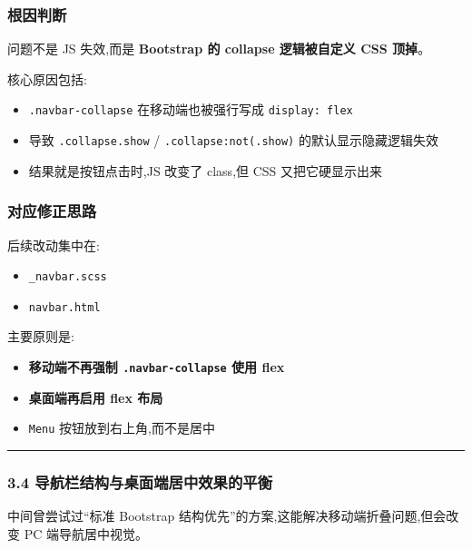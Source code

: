 \documentclass[lang=cn,scheme=chinese,color=blue,device=normal,toc=onecol,math=cm]{elegantbook}
\begin{document}
\subsubsection{根因判断}


问题不是 JS 失效,而是 \textbf{Bootstrap 的 collapse 逻辑被自定义 CSS 顶掉}。\par


核心原因包括:\par


\begin{itemize}
\item \texttt{.navbar-collapse} 在移动端也被强行写成 \texttt{display: flex}
\item 导致 \texttt{.collapse.show} /\allowbreak{} \texttt{.collapse:not(.show)} 的默认显示隐藏逻辑失效
\item 结果就是按钮点击时,JS 改变了 class,但 CSS 又把它硬显示出来
\end{itemize}


\subsubsection{对应修正思路}


后续改动集中在:\par


\begin{itemize}
\item \texttt{\_\allowbreak{}navbar.scss}
\item \texttt{navbar.html}
\end{itemize}


主要原则是:\par


\begin{itemize}
\item \textbf{移动端不再强制 \texttt{.navbar-collapse} 使用 flex}
\item \textbf{桌面端再启用 flex 布局}
\item \texttt{Menu} 按钮放到右上角,而不是居中
\end{itemize}


\medskip\hrule\medskip


\subsubsection{3.4 导航栏结构与桌面端居中效果的平衡}


中间曾尝试过“标准 Bootstrap 结构优先”的方案,这能解决移动端折叠问题,但会改变 PC 端导航居中视觉。\par
\end{document}
